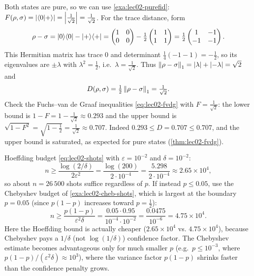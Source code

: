 \begin{solution}
Both states are pure, so we can use \cref{exa:lec02-purefid}:
$F(\rho,\sigma)=\left\lvert \braket{0|+} \right\rvert=\left\lvert \tfrac{1}{\sqrt2} \right\rvert=\tfrac{1}{\sqrt2}$. For
the trace distance, form
\[
  \rho-\sigma=\ket{0}\!\bra{0}-\ket{+}\!\bra{+}
   =\begin{pmatrix}1&0\\0&0\end{pmatrix}-\tfrac12\begin{pmatrix}1&1\\1&1\end{pmatrix}
   =\tfrac12\begin{pmatrix}1&-1\\-1&-1\end{pmatrix}.
\]
This Hermitian matrix has trace $0$ and determinant
$\tfrac14(-1-1)=-\tfrac12$, so its eigenvalues are $\pm\lambda$ with
$\lambda^{2}=\tfrac12$, i.e.\ $\lambda=\tfrac{1}{\sqrt2}$. Thus
$\left\lVert \rho-\sigma \right\rVert_1=\left\lvert \lambda \right\rvert+\left\lvert -\lambda \right\rvert=\sqrt2$ and
\[
  D(\rho,\sigma)=\tfrac12\left\lVert \rho-\sigma \right\rVert_1=\tfrac{1}{\sqrt2}.
\]
Check the Fuchs--van de Graaf inequalities \eqref{eq:lec02-fvdg} with
$F=\tfrac{1}{\sqrt2}$: the lower bound is $1-F=1-\tfrac{1}{\sqrt2}\approx0.293$ and
the upper bound is $\sqrt{1-F^{2}}=\sqrt{1-\tfrac12}=\tfrac{1}{\sqrt2}\approx0.707$.
Indeed $0.293\le D=0.707\le0.707$, and the upper bound is saturated, as expected for
pure states (\cref{thm:lec02-fvdg}).
\end{solution}

\begin{solution}
Hoeffding budget \eqref{eq:lec02-shots} with $\varepsilon=10^{-2}$ and
$\delta=10^{-2}$:
\[
  n\ge\frac{\log(2/\delta)}{2\varepsilon^{2}}
    =\frac{\log(200)}{2\cdot10^{-4}}
    =\frac{5.298}{2\cdot10^{-4}}\approx2.65\times10^{4},
\]
so about $n=26\,500$ shots suffice regardless of $p$. If instead $p\le0.05$, use the
Chebyshev budget of \cref{exa:lec02-cheb-shots}, which is largest at the boundary
$p=0.05$ (since $p(1-p)$ increases toward $p=\tfrac12$):
\[
  n\ge\frac{p(1-p)}{\varepsilon^{2}\delta}
    =\frac{0.05\cdot0.95}{10^{-4}\cdot10^{-2}}
    =\frac{0.0475}{10^{-6}}=4.75\times10^{4}.
\]
Here the Hoeffding bound is actually cheaper ($2.65\times10^{4}$ vs.
$4.75\times10^{4}$), because Chebyshev pays a $1/\delta$ (not $\log(1/\delta)$)
confidence factor. The Chebyshev estimate becomes advantageous only for much smaller
$p$ (e.g.\ $p\le10^{-3}$, where $p(1-p)/(\varepsilon^{2}\delta)\approx10^{3}$),
where the variance factor $p(1-p)$ shrinks faster than the confidence penalty grows.
\end{solution}

